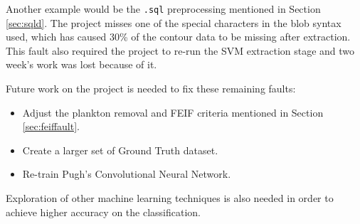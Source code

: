 \documentclass[bsc,logo,twoside,fullspacing,parskip]{infthesis}
\begin{document}
Another example would be the {\tt .sql} preprocessing mentioned in Section \ref{sec:sqld}.
The project misses one of the special characters in the blob syntax used, which has caused 30\% of the contour data to be missing after extraction.
This fault also required the project to re-run the SVM extraction stage and two week's work was lost because of it.

Future work on the project is needed to fix these remaining faults:
\begin{itemize}
\setlength{\parskip}{0pt}
\item Adjust the plankton removal and FEIF criteria mentioned in Section \ref{sec:feiffault}.
\item Create a larger set of Ground Truth dataset.
\item Re-train Pugh's Convolutional Neural Network.
\end{itemize}
 
Exploration of other machine learning techniques is also needed in order to achieve higher accuracy on the classification. 

\let\OLDthebibliography\thebibliography
\renewcommand\thebibliography[1]{
  \OLDthebibliography{#1}
  \setlength{\parskip}{0pt}
  \setlength{\itemsep}{5pt plus 0.3ex}
}



\end{document}
